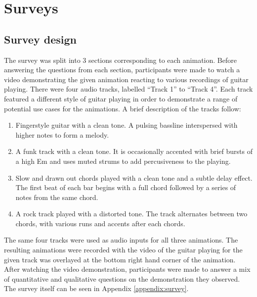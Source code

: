 \documentclass[../initial_thesis.tex]{subfiles}
\begin{document}
\section{Surveys}

\subsection{Survey design}
The survey was split into 3 sections corresponding to each animation. Before answering the questions from each section, participants were made to watch a video demonstrating the given animation reacting to various recordings of guitar playing. There were four audio tracks, labelled ``Track 1'' to ``Track 4''. Each track featured a different style of guitar playing in order to demonstrate a range of potential use cases for the animations. A brief description of the tracks follow:

\begin{enumerate}
\item {Fingerstyle guitar with a clean tone. A pulsing bassline interspersed with higher notes to form a melody.} %
\item {A funk track with a clean tone. It is occasionally accented with brief bursts of a high Em and uses muted strums to add percusiveness to the playing.}
\item {Slow and drawn out chords played with a clean tone and a subtle delay effect. The first beat of each bar begins with a full chord followed by a series of notes from the same chord.}
\item {A rock track played with a distorted tone. The track alternates between two chords, with various runs and accents after each chords.}
\end{enumerate}

The same four tracks were used as audio inputs for all three animations. The resulting animations were recorded with the video of the guitar playing for the given track was overlayed at the bottom right hand corner of the animation. After watching the video demonstration, participants were made to answer a mix of quantitative and qualitative questions on the demonstration they observed. The survey itself can be seen in Appendix \ref{appendix:survey}. \par
\end{document}

